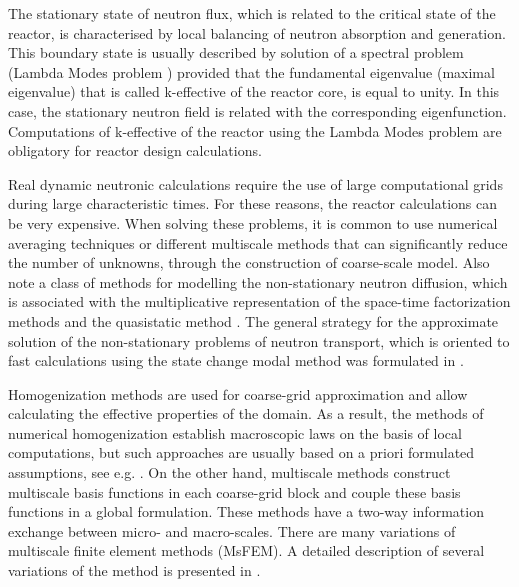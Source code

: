 \documentclass[runningheads]{llncs}
\begin{document}
The stationary state of neutron flux, which is related to the critical state of the reactor, is characterised by local balancing of neutron absorption and generation. 
This boundary state is usually described by solution of a spectral problem (Lambda Modes problem \cite{Verdu1994, Annals2017, Munoz2019}) provided that the fundamental eigenvalue (maximal eigenvalue) that is called k-effective of the reactor core, is equal to unity. 
In this case, the stationary neutron field is related with the corresponding eigenfunction.
Computations of k-effective of the reactor using the Lambda Modes problem are obligatory for reactor design calculations.

Real dynamic neutronic calculations require the use of large computational grids during large characteristic times. For these reasons, the reactor calculations can be very expensive.
When solving these problems, it is common to use numerical averaging techniques or different multiscale methods that can significantly reduce the number of unknowns, through the construction of coarse-scale model.
Also note a class of methods for modelling the non-stationary  neutron diffusion, which is associated with the multiplicative representation of the space-time factorization methods and the quasistatic method \cite{dulla2008quasi, Carreno2019}. 
The general strategy for the approximate solution of the non-stationary problems of neutron transport, which is oriented to fast calculations using the state change modal method was formulated in \cite{Progress2018}.

Homogenization methods are used for coarse-grid approximation and allow calculating the effective properties of the domain.
As a result, the methods of numerical homogenization establish macroscopic laws on the basis of local computations, but such approaches are usually based on a priori formulated assumptions, see e.g. \cite{Stalnov2017,Bakhvalov2012, Vidal2018}. 
On the other hand, multiscale methods construct multiscale basis functions in each coarse-grid block and couple these basis functions in a global formulation. 
These methods have a two-way information exchange between micro- and macro-scales. 
There are many variations of multiscale finite element methods (MsFEM).
A detailed description of several variations of the method is presented in \cite{Efendiev2009}.
\end{document}
